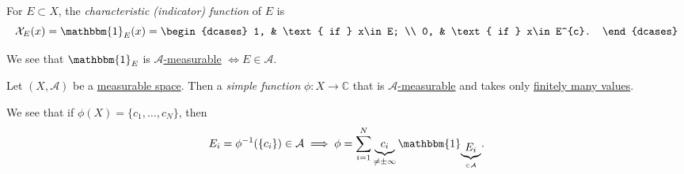 \begin{definition}\label{def:characteristic-function}
	For \(E\subset X\), the \emph{characteristic (indicator) function} of \(E\) is
	\[
		\mathcal{X} _E (x)= \mathbbm{1}_{E}(x) = \begin{dcases}
			1, & \text{ if }  x\in E;     \\
			0, & \text{ if }  x\in E^{c}.
		\end{dcases}
	\]
\end{definition}
\begin{remark}
	We see that \(\mathbbm{1}_{ E}\) is \hyperref[def:A-measurable-function]{\(\mathcal{A}\)-measurable} \(\iff E\in\mathcal{A}\).
\end{remark}

\begin{definition}\label{def:simple-function}
	Let \((X, \mathcal{A} )\) be a \hyperref[def:measurable-space]{measurable space}. Then a \emph{simple function} \(\phi \colon X\to \mathbb{C} \) that
	is \hyperref[def:A-measurable-function]{\(\mathcal{A} \)-measurable} and takes only \underline{finitely many values}.
\end{definition}
\begin{remark}
	We see that if \(\phi (X) = \{c_1, \dots , c_N \}\), then
	\[
		E_{i}= \phi ^{-1} (\{c_{i}\})\in \mathcal{A} \implies \phi = \sum_{i=1}^{N} \underbrace{c_{i}}_{\neq \pm \infty }\mathbbm{1}_{\underbrace{E_{i}}_{\in \mathcal{A}}}.
	\]
\end{remark}